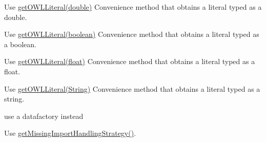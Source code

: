 \begin{DoxyRefList}
\item[\label{deprecated__deprecated000009}%
\hypertarget{deprecated__deprecated000009}{}%
Member \hyperlink{interfaceorg_1_1semanticweb_1_1owlapi_1_1model_1_1_o_w_l_data_factory_a76989cb1bb3ddd70b180935bd184b53a}{org.semanticweb.owlapi.model.O\-W\-L\-Data\-Factory.get\-O\-W\-L\-Typed\-Literal} (double value)]Use \hyperlink{}{get\-O\-W\-L\-Literal(double)} Convenience method that obtains a literal typed as a double.  
\item[\label{deprecated__deprecated000010}%
\hypertarget{deprecated__deprecated000010}{}%
Member \hyperlink{interfaceorg_1_1semanticweb_1_1owlapi_1_1model_1_1_o_w_l_data_factory_a1ea74721fc57a811106a9ed9db4d8e39}{org.semanticweb.owlapi.model.O\-W\-L\-Data\-Factory.get\-O\-W\-L\-Typed\-Literal} (boolean value)]Use \hyperlink{}{get\-O\-W\-L\-Literal(boolean)} Convenience method that obtains a literal typed as a boolean.  
\item[\label{deprecated__deprecated000011}%
\hypertarget{deprecated__deprecated000011}{}%
Member \hyperlink{interfaceorg_1_1semanticweb_1_1owlapi_1_1model_1_1_o_w_l_data_factory_a47caa4baefc31d1fbeb9b64fc9d7c6bd}{org.semanticweb.owlapi.model.O\-W\-L\-Data\-Factory.get\-O\-W\-L\-Typed\-Literal} (float value)]Use \hyperlink{}{get\-O\-W\-L\-Literal(float)} Convenience method that obtains a literal typed as a float.  
\item[\label{deprecated__deprecated000012}%
\hypertarget{deprecated__deprecated000012}{}%
Member \hyperlink{interfaceorg_1_1semanticweb_1_1owlapi_1_1model_1_1_o_w_l_data_factory_a6b9d863c0f429efb03cc40d24cd954e0}{org.semanticweb.owlapi.model.O\-W\-L\-Data\-Factory.get\-O\-W\-L\-Typed\-Literal} (String value)]Use \hyperlink{}{get\-O\-W\-L\-Literal(\-String)} Convenience method that obtains a literal typed as a string.  
\item[\label{deprecated__deprecated000015}%
\hypertarget{deprecated__deprecated000015}{}%
Member \hyperlink{interfaceorg_1_1semanticweb_1_1owlapi_1_1model_1_1_o_w_l_entity_a0e10754136af0b1494f87481ca3f1bf6}{org.semanticweb.owlapi.model.O\-W\-L\-Entity.get\-O\-W\-L\-Entity} (Entity\-Type$<$ E $>$ entity\-Type)]use a datafactory instead  
\item[\label{deprecated__deprecated000017}%
\hypertarget{deprecated__deprecated000017}{}%
Member \hyperlink{classorg_1_1semanticweb_1_1owlapi_1_1model_1_1_o_w_l_ontology_loader_configuration_afbfb9810ba36f03d56b24fc08322d5b9}{org.semanticweb.owlapi.model.O\-W\-L\-Ontology\-Loader\-Configuration.is\-Silent\-Missing\-Imports\-Handling} ()]Use \hyperlink{}{get\-Missing\-Import\-Handling\-Strategy()}.  

\end{DoxyRefList}

